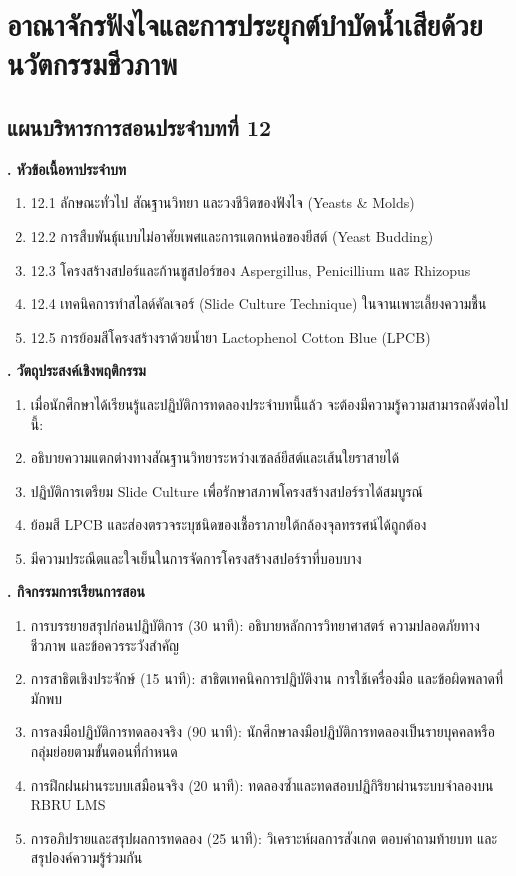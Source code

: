 \chapter{อาณาจักรฟังไจและการประยุกต์บำบัดน้ำเสียด้วยนวัตกรรมชีวภาพ}
\label{chap:ch12}

\section*{แผนบริหารการสอนประจำบทที่ 12}

\noindent\textbf{. หัวข้อเนื้อหาประจำบท}

\begin{enumerate}
    \item 12.1 ลักษณะทั่วไป สัณฐานวิทยา และวงชีวิตของฟังไจ (Yeasts \& Molds)
    \item 12.2 การสืบพันธุ์แบบไม่อาศัยเพศและการแตกหน่อของยีสต์ (Yeast Budding)
    \item 12.3 โครงสร้างสปอร์และก้านชูสปอร์ของ Aspergillus, Penicillium และ Rhizopus
    \item 12.4 เทคนิคการทำสไลด์คัลเจอร์ (Slide Culture Technique) ในจานเพาะเลี้ยงความชื้น
    \item 12.5 การย้อมสีโครงสร้างราด้วยน้ำยา Lactophenol Cotton Blue (LPCB)
\end{enumerate}

\noindent\textbf{. วัตถุประสงค์เชิงพฤติกรรม}

\begin{enumerate}
    \item เมื่อนักศึกษาได้เรียนรู้และปฏิบัติการทดลองประจำบทนี้แล้ว จะต้องมีความรู้ความสามารถดังต่อไปนี้:
    \item อธิบายความแตกต่างทางสัณฐานวิทยาระหว่างเซลล์ยีสต์และเส้นใยราสายได้
    \item ปฏิบัติการเตรียม Slide Culture เพื่อรักษาสภาพโครงสร้างสปอร์ราได้สมบูรณ์
    \item ย้อมสี LPCB และส่องตรวจระบุชนิดของเชื้อราภายใต้กล้องจุลทรรศน์ได้ถูกต้อง
    \item มีความประณีตและใจเย็นในการจัดการโครงสร้างสปอร์ราที่บอบบาง
\end{enumerate}

\noindent\textbf{. กิจกรรมการเรียนการสอน}

\begin{enumerate}
    \item การบรรยายสรุปก่อนปฏิบัติการ (30 นาที): อธิบายหลักการวิทยาศาสตร์ ความปลอดภัยทางชีวภาพ และข้อควรระวังสำคัญ
    \item การสาธิตเชิงประจักษ์ (15 นาที): สาธิตเทคนิคการปฏิบัติงาน การใช้เครื่องมือ และข้อผิดพลาดที่มักพบ
    \item การลงมือปฏิบัติการทดลองจริง (90 นาที): นักศึกษาลงมือปฏิบัติการทดลองเป็นรายบุคคลหรือกลุ่มย่อยตามขั้นตอนที่กำหนด
    \item การฝึกฝนผ่านระบบเสมือนจริง (20 นาที): ทดลองซ้ำและทดสอบปฏิกิริยาผ่านระบบจำลองบน RBRU LMS
    \item การอภิปรายและสรุปผลการทดลอง (25 นาที): วิเคราะห์ผลการสังเกต ตอบคำถามท้ายบท และสรุปองค์ความรู้ร่วมกัน
\end{enumerate}

